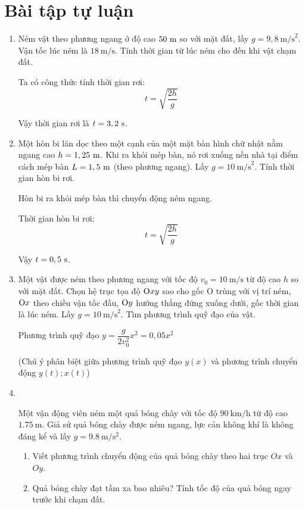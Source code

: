 \section{Bài tập tự luận}
\begin{enumerate}[label=\bfseries Bài \arabic*:]
	\item {}
	
	
	{Ném vật theo phương ngang ở độ cao $50\ \text m$ so với mặt đất, lấy $g=9,8\ \text{m/s}^2$. Vận tốc lúc ném là $18\ \text{m/s}$. Tính thời gian từ lúc ném cho đến khi vật chạm đất.
	}
	
	\hideall
	{
		Ta có công thức tính thời gian rơi:
		\[t=\sqrt{\dfrac{2h}{g}}\]
		
		Vậy thời gian rơi là $t=3,2\ \text s$.
	}
	\item {}
	
	
	{Một hòn bi lăn dọc theo một cạnh của một mặt bàn hình chữ nhật nằm ngang cao $h=1,25\ \text m$. Khi ra khỏi mép bàn, nó rơi xuống nền nhà tại điểm cách mép bàn $L=1,5\ \text m$ (theo phương ngang). Lấy $g=10\ \text{m/s}^2$. Tính thời gian hòn bi rơi.
	}
	
	\hideall
	{	Hòn bi ra khỏi mép bàn thì chuyển động ném ngang.
		
		Thời gian hòn bi rơi:
		\[t=\sqrt{\dfrac{2h}{g}}\]
		
		Vậy $t= 0,5\ \text s$.
	}
	\item {}
	
	
	{Một vật được ném theo phương ngang với tốc độ $v_0 = 10\ \text{m/s}$ từ độ cao $h$ so với mặt đất. Chọn hệ trục tọa độ $\text Oxy$ sao cho gốc O trùng với vị trí ném, $\text O x$ theo chiều vận tốc đầu, $\text Oy$ hướng thẳng đứng xuống dưới, gốc thời gian là lúc ném. Lấy $g=10\ \text{m/s}^2$. Tìm phương trình quỹ đạo của vật.
	}
	
	\hideall
	{	Phương trình quỹ đạo $y=\dfrac{g}{2v_0^2}x^2 = 0,05x^2$
		
		(Chú ý phân biệt giữa phương trình quỹ đạo $y(x)$ và phương trình chuyển động $y(t); x(t)$)
	}
	
	\item {}\\
	{Một vận động viên ném một quả bóng chày với tốc độ $\SI{90}{\kilo\meter/\hour}$ từ độ cao $\SI{1.75}{\meter}$. Giả sử quả bóng chày được ném ngang, lực cản không khí là không đáng kể và lấy $g=\SI{9.8}{\meter/\second^2}$.
		\begin{enumerate}[label=\alph*)]
			\item Viết phương trình chuyển động của quả bóng chày theo hai 	trục $Ox$ và $Oy$.
			\item Quả bóng chày đạt tầm xa bao nhiêu? Tính tốc độ của quả bóng ngay trước khi chạm đất.
		\end{enumerate}
	
}
\end{enumerate}
